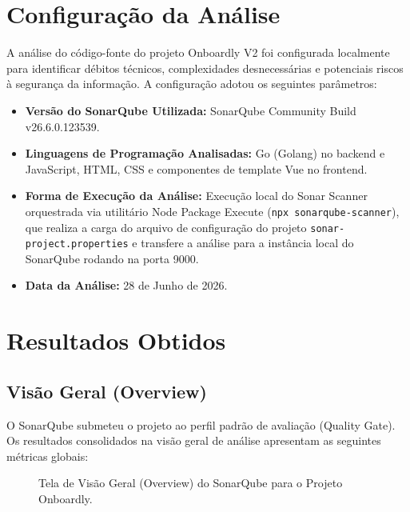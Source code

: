 \documentclass[12pt,a4paper]{article}
\begin{document}
\section{Configuração da Análise}

A análise do código-fonte do projeto Onboardly V2 foi configurada localmente para identificar débitos técnicos, complexidades desnecessárias e potenciais riscos à segurança da informação. A configuração adotou os seguintes parâmetros:

\begin{itemize}
    \item \textbf{Versão do SonarQube Utilizada:} SonarQube Community Build v26.6.0.123539.
    \item \textbf{Linguagens de Programação Analisadas:} Go (Golang) no backend e JavaScript, HTML, CSS e componentes de template Vue no frontend.
    \item \textbf{Forma de Execução da Análise:} Execução local do Sonar Scanner orquestrada via utilitário Node Package Execute (\texttt{npx sonarqube-scanner}), que realiza a carga do arquivo de configuração do projeto \texttt{sonar-project.properties} e transfere a análise para a instância local do SonarQube rodando na porta 9000.
    \item \textbf{Data da Análise:} 28 de Junho de 2026.
\end{itemize}

\section{Resultados Obtidos}

\subsection{Visão Geral (Overview)}
O SonarQube submeteu o projeto ao perfil padrão de avaliação (Quality Gate). Os resultados consolidados na visão geral de análise apresentam as seguintes métricas globais:

\begin{figure}[H]
    \centering
    \label{fig:overview}
    \caption{Tela de Visão Geral (Overview) do SonarQube para o Projeto Onboardly.}
\end{figure}
\end{document}
